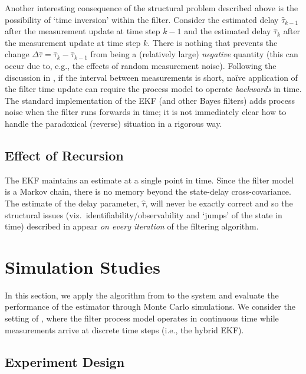 \documentclass[letterpaper,10pt,conference]{ieeeconf}
\theoremstyle{definition}
\begin{document}
Another interesting consequence of the structural problem described above is the possibility of `time inversion' within the filter.
%
Consider the estimated delay $\hat{\tau}_{k - 1}$ after the measurement update at time step $k - 1$ and the estimated delay $\hat{\tau}_{k}$ after the measurement update at time step $k$.
%
There is nothing that prevents the change $\Delta\hat{\tau} = \hat{\tau}_{k} - \hat{\tau}_{k - 1}$ from being a (relatively large) \emph{negative} quantity (this can occur due to, e.g., the effects of random measurement noise).
%
Following the discussion in , if the interval between measurements is short, na\"{i}ve application of the filter time update can require the process model to operate \emph{backwards} in time.
%
The standard implementation of the EKF (and other Bayes filters) adds process noise when the filter runs forwards in time; it is not immediately clear how to handle the paradoxical (reverse) situation in a rigorous way.

\subsection{Effect of Recursion}
\label{subsec:recursion}

The EKF maintains an estimate at a single point in time.
%
Since the filter model is a Markov chain, there is no memory beyond the state-delay cross-covariance.
%
The estimate of the delay parameter, $\hat{\tau}$, will never be exactly correct and so the structural issues (viz.\ identifiability/observability and `jumps' of the state in time) described in  appear \emph{on every iteration} of the filtering algorithm.

\section{Simulation Studies}
\label{sec:experiments}

In this section, we apply the algorithm from \cite{2014_Li_Online} to the system  and evaluate the performance of the estimator through Monte Carlo simulations.
%
We consider the setting of , where the filter process model operates in continuous time while measurements arrive at discrete time steps (i.e., the hybrid EKF).

\subsection{Experiment Design}
\label{subsec:design}
\end{document}
